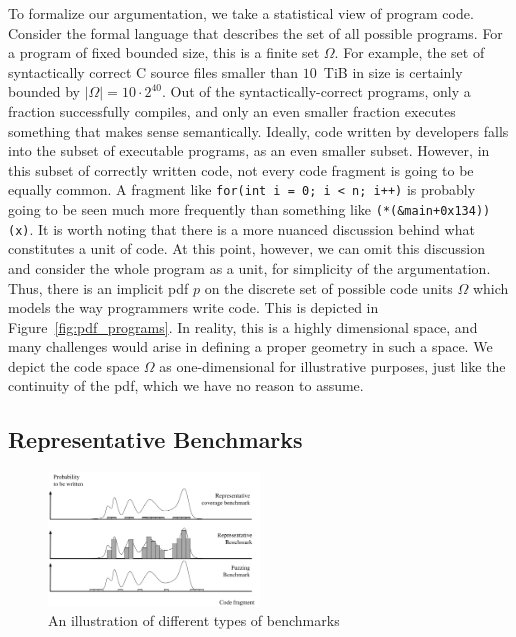 To formalize our argumentation, we take a statistical view of program code.
Consider the formal language that describes the set of all possible programs.
For a program of fixed bounded size, this is a finite set $\Omega$.
For example, the set of syntactically correct C source files smaller than $10$~TiB in size is certainly bounded by $|\Omega| = 10 \cdot 2^{40}$.
Out of the syntactically-correct programs, only a fraction successfully compiles, and only an even smaller fraction executes something that makes sense semantically.
Ideally, code written by developers falls into the subset of executable programs, as an even smaller subset.
However, in this subset of correctly written code, not every code fragment is going to be equally common.
A fragment like
\texttt{for(int i = 0; i < n; i++)} is probably going to be seen much more frequently than something like \texttt{(*(\&main+0x134))(x)}.
It is worth noting that there is a more nuanced discussion behind what constitutes a unit of code.
At this point, however, we can omit this discussion and consider the whole program as a unit, for simplicity of the argumentation.
Thus, there is an implicit \ac{pdf} $p$ on the discrete set of possible code units $\Omega$ which models the way programmers write code.
This is depicted in Figure~\ref{fig:pdf_programs}.
In reality, this is a highly dimensional space, and many challenges would arise in defining a proper geometry in such a space.
We depict the code space $\Omega$ as one-dimensional for illustrative purposes, just like the continuity of the \ac{pdf}, which we have no reason to assume.

\subsection{Representative Benchmarks}
\label{sec:representative_benchmarks}

\begin{figure}[th]
	\centering
	\includegraphics[width=0.5\textwidth]{figures/benchmark_types.pdf}
	\caption{An illustration of different types of benchmarks}
	\label{fig:benchmark_types}
\end{figure}

